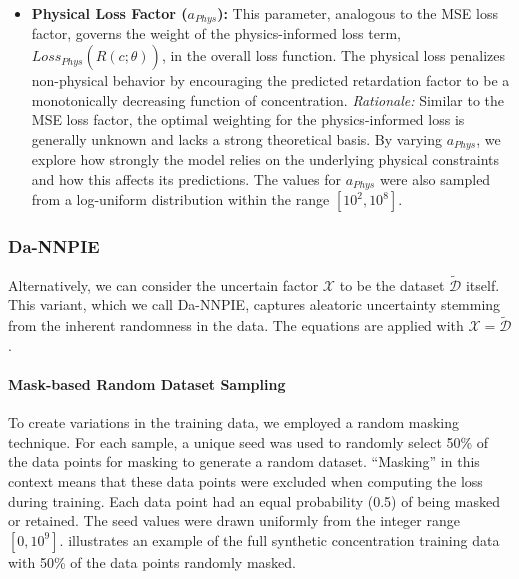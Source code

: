 \begin{itemize}
    \item \textbf{Physical Loss Factor ($a_{Phys}$):} This parameter, analogous to the MSE loss factor, governs the weight of the physics-informed loss term, $Loss_{Phys}(\hat{R}(c;\theta))$, in the overall loss function. The physical loss penalizes non-physical behavior by encouraging the predicted retardation factor to be a monotonically decreasing function of concentration. \textit{Rationale:} Similar to the MSE loss factor, the optimal weighting for the physics-informed loss is generally unknown and lacks a strong theoretical basis. By varying $a_{Phys}$, we explore how strongly the model relies on the underlying physical constraints and how this affects its predictions. The values for $a_{Phys}$ were also sampled from a log-uniform distribution within the range $[10^2, 10^8]$.
\end{itemize}



\subsubsection{Da-NNPIE}

Alternatively, we can consider the uncertain factor $\mathcal{X}$ to be the dataset $\tilde{\mathcal{D}}$ itself. This variant, which we call Da-NNPIE, captures aleatoric uncertainty stemming from the inherent randomness in the data. The equations are applied with $\mathcal{X} = \tilde{\mathcal{D}}$.


\paragraph{Mask-based Random Dataset Sampling}

To create variations in the training data, we employed a random masking technique. For each sample, a unique seed was used to randomly select 50\% of the data points for masking to generate a random dataset. ``Masking'' in this context means that these data points were excluded when computing the loss during training. Each data point had an equal probability (0.5) of being masked or retained. The seed values were drawn uniformly from the integer range $[0, 10^9]$.  illustrates an example of the full synthetic concentration training data with 50\% of the data points randomly masked.

